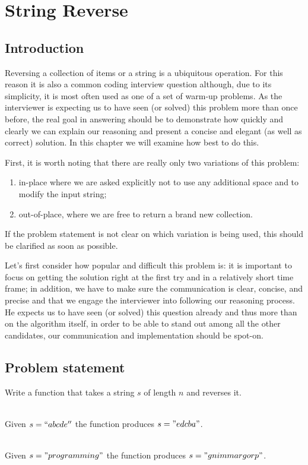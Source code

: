 %

\chapter{String Reverse}
\label{ch:string_reverse}
\section*{Introduction}
Reversing a collection of items or a string is a ubiquitous operation. For this reason it is also a common coding interview question although,  due to its simplicity, it is most often used as one of a set of warm-up problems. As the interviewer is expecting us to have seen (or solved) this problem more than once before, the real goal in answering should be to demonstrate how quickly and clearly we can explain our reasoning and present a concise and elegant (as well as correct) solution. In this chapter we will examine how best to do this. 

First, it is worth noting that there are really only two variations of this problem:

\begin{enumerate}
  \item in-place where we are asked explicitly not to use any additional space and to modify the input string;
  \item out-of-place, where we are free to return a brand new collection.
\end{enumerate}
If the problem statement is not clear on which variation is being used, this should be clarified as soon as possible. 

Let’s first consider how popular and difficult this problem is: it is important to focus on getting the solution right at the first try and in a relatively short time frame; in addition, we have to make sure the communication is clear, concise, and precise and that we engage the interviewer into following our reasoning process.
He expects us to have seen (or solved) this question already and thus more than on the algorithm itself, in order to be able to stand out among all the other candidates, our communication and implementation should be spot-on.

\section{Problem statement}
\begin{exercise}
	Write a function that takes a string $s$ of length $n$ and reverses it.
	
	\begin{example}
		\hfill \\
		Given $s=``abcde''$ the function produces $s="edcba"$.
	\end{example}
	
	\begin{example}
		\hfill \\
		Given $s="programming"$ the function produces $s="gnimmargorp"$.
	\end{example}
\end{exercise}


